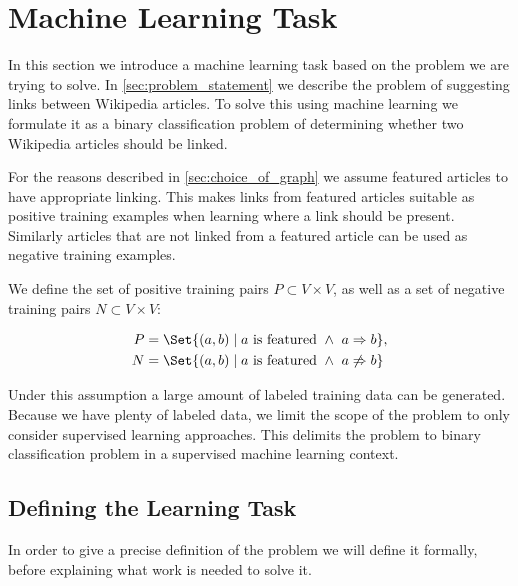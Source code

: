 \section{Machine Learning Task}\label{sec:machine_learning_task}
In this section we introduce a machine learning task based on the problem we are trying to solve. In \cref{sec:problem_statement} we describe the problem of suggesting links between Wikipedia articles. To solve this using machine learning we formulate it as a binary classification problem of determining whether two Wikipedia articles should be linked.

For the reasons described in \cref{sec:choice_of_graph} we assume featured articles to have appropriate linking. This makes links from featured articles suitable as positive training examples when learning where a link should be present. Similarly articles that are not linked from a featured article can be used as negative training examples.

We define the set of positive training pairs $P \subset V \times V$, as well as a set of negative training pairs $N \subset V \times V$:

\begin{align*}
P &= \Set{(a,b) \mid a\text{ is featured}\ \wedge\ a \Rightarrow b}, \\
N &= \Set{(a,b) \mid a\text{ is featured}\ \wedge\ a \not\Rightarrow b}
\end{align*}

Under this assumption a large amount of labeled training data can be generated. Because we have plenty of labeled data, we limit the scope of the problem to only consider supervised learning approaches. This delimits the problem to binary classification problem in a supervised machine learning context.


\subsection{Defining the Learning Task}
\label{sec:ml_def}
In order to give a precise definition of the problem we will define it formally, before explaining what work is needed to solve it.


